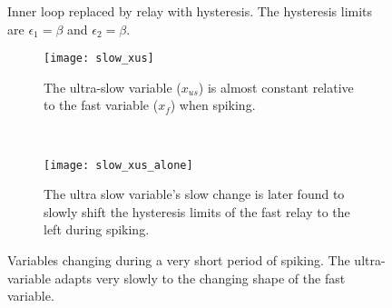\documentclass[a4paper, 12pt]{article}
\begin{document}
\begin{figure}[h!]
{
}
\caption{Inner loop replaced by relay with hysteresis. The hysteresis limits are $\epsilon_1 = \beta$ and $\epsilon_2 = \beta$.}
\label{fig:bursting_step1}
\end{figure}




\begin{figure}
    \centering
    \begin{subfigure}[t]{0.45\textwidth}
        \texttt{[image: slow\_xus]}
        \caption{The ultra-slow variable ($x_{us}$) is almost constant relative to the fast variable ($x_f$) when spiking. }
        \label{fig:slow_xus}
    \end{subfigure}
    ~ %
    \begin{subfigure}[t]{0.45\textwidth}
        \texttt{[image: slow\_xus\_alone]}
        \caption{The ultra slow variable's slow change is later found to slowly shift the hysteresis limits of the fast relay to the left during spiking.}
        \label{fig:fig:slow_xus_alone}
    \end{subfigure}
\caption{Variables changing during a very short period of spiking. The ultra-variable adapts very slowly to the changing shape of the fast variable.}
\label{fig:bursting_step2.11}
\end{figure}
\end{document}
